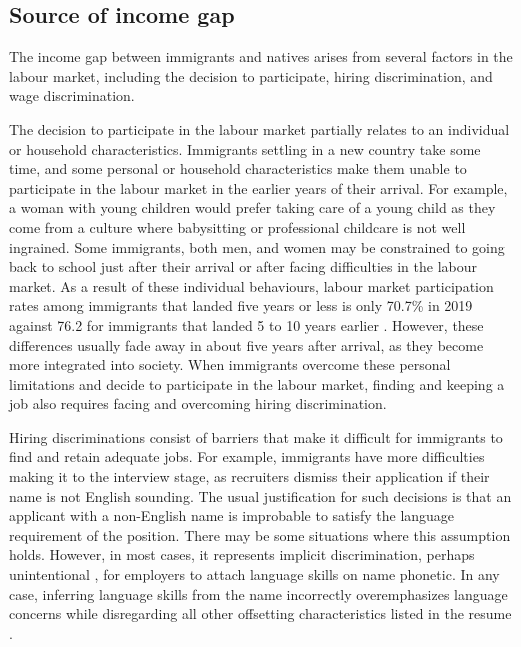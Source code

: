 \subsection{Source of income gap}

The income gap between immigrants and natives arises from several factors in the labour market, including the decision to participate, hiring discrimination, and wage discrimination.

\vspace{0.7em}\par
The decision to participate in the labour market partially relates to an individual or household characteristics.
Immigrants settling in a new country take some time, and some personal or household characteristics make them unable to participate in the labour market in the earlier years of their arrival.
For example, a woman with young children would prefer taking care of a young child as they come from a culture where babysitting or professional childcare is not well ingrained.
Some immigrants, both men, and women may be constrained to going back to school just after their arrival or after facing difficulties in the labour market.
As a result of these individual behaviours, labour market participation rates among immigrants that landed five years or less is only 70.7\% in 2019 against 76.2 for immigrants that landed 5 to 10 years earlier \citep{statCan:002}.
However, these differences usually fade away in about five years after arrival, as they become more integrated into society.
When immigrants overcome these personal limitations and decide to participate in the labour market, finding and keeping a job also requires facing and overcoming hiring discrimination.

\vspace{0.7em}\par
Hiring discriminations consist of barriers that make it difficult for immigrants to find and retain adequate jobs.
For example, immigrants have more difficulties making it to the interview stage, as recruiters dismiss their application if their name is not English sounding.
The usual justification for such decisions is that an applicant with a non-English name is improbable to satisfy the language requirement of the position.
There may be some situations where this assumption holds.
However, in most cases, it represents implicit discrimination, perhaps unintentional \citep{Crandall:wo,ROOTH2010523}, for employers to attach language skills on name phonetic.
In any case, inferring language skills from the name incorrectly overemphasizes language concerns while disregarding all other offsetting characteristics listed in the resume \citep{Oreopoulos:2011jv}.

